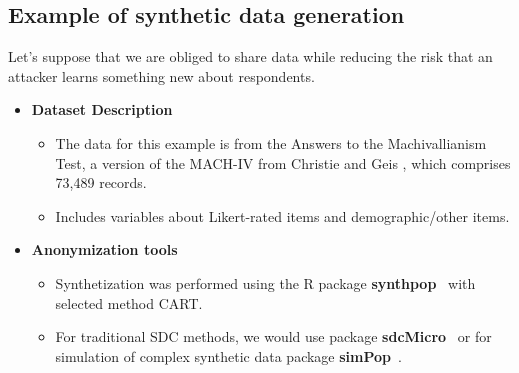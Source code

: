 \documentclass[a0,portrait]{a0poster}
\begin{document}
\begin{multicols}{3}

\section{Example of synthetic data generation}

Let's suppose that we are obliged to share data 
while reducing the risk that an attacker learns something new about respondents.

\begin{itemize}
    \item[\ding{228}] \textbf{Dataset Description}
        \begin{itemize}   
            \item[\textbullet] The data for this example is from the Answers to the Machivallianism Test, a version of the MACH-IV from Christie and Geis \cite{Data}, which comprises 73,489 records.
            \item[\textbullet] Includes variables about Likert-rated items and demographic/other items.
        \end{itemize}
    \item[\ding{228}] \textbf{Anonymization tools}
        \begin{itemize}   
            \item[\textbullet] Synthetization was performed using the R package \textbf{synthpop}~\cite{2022_Synthpop}
             with selected method CART.
            \item[\textbullet] For traditional SDC methods, we would use package \textbf{sdcMicro}~\cite{2024_Sdcmicro}
            or for simulation of complex synthetic data package \textbf{simPop}~\cite{2022_Simpop}.
        \end{itemize}
\end{itemize}


\end{multicols}
\end{document}
